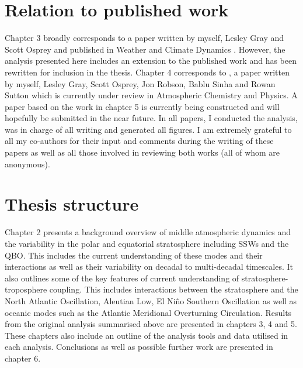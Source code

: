 \section{Relation to published work}

Chapter 3 broadly corresponds to a paper written by myself, Lesley Gray and Scott Osprey and published in Weather and Climate Dynamics \citep{dimdore-milesOrigins2021}. However, the analysis presented here includes an extension to the published work and has been rewritten for inclusion in the thesis. Chapter 4 corresponds to \cite{dimdore-milesInteractions2021}, a paper written by myself, Lesley Gray, Scott Osprey, Jon Robson, Bablu Sinha and Rowan Sutton which is currently under review in Atmospheric Chemistry and Physics. A paper based on the work in chapter 5 is currently being constructed and will hopefully be submitted in the near future. 
In all papers, I conducted the analysis, was in charge of all writing and generated all figures. I am extremely grateful to all my co-authors for their input and comments during the writing of these papers as well as all those involved in reviewing both works (all of whom are anonymous).  

\section{Thesis structure}
Chapter 2 presents a background overview of middle atmospheric dynamics and the variability in the polar and equatorial stratosphere including SSWs and the QBO. This includes the current understanding of these modes and their interactions as well as their variability on decadal to multi-decadal timescales. It also outlines some of the key features of current understanding of stratosphere-troposphere coupling. This includes interactions between the stratosphere and the North Atlantic Oscillation, Aleutian Low, El Ni\~{n}o Southern Oscillation as well as oceanic modes such as the Atlantic Meridional Overturning Circulation. Results from the original analysis summarised above are presented in chapters 3, 4 and 5. These chapters also include an outline of the analysis tools and data utilised in each analysis. Conclusions as well as possible further work are presented in chapter 6.









